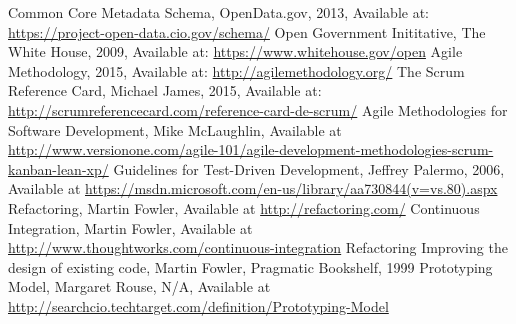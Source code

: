 \begin{thebibliography}{1}
    Common Core Metadata Schema, OpenData.gov, 2013, Available at: \url{https://project-open-data.cio.gov/schema/}
    Open Government Inititative, The White House, 2009, Available at: \url{https://www.whitehouse.gov/open}
    Agile Methodology, 2015, Available at: \url{http://agilemethodology.org/}
    The Scrum Reference Card, Michael James, 2015, Available at: \url{http://scrumreferencecard.com/reference-card-de-scrum/}
    Agile Methodologies for Software Development, Mike McLaughlin, Available at \url{http://www.versionone.com/agile-101/agile-development-methodologies-scrum-kanban-lean-xp/}
    Guidelines for Test-Driven Development, Jeffrey Palermo, 2006, Available at \url{https://msdn.microsoft.com/en-us/library/aa730844(v=vs.80).aspx}
    Refactoring, Martin Fowler, Available at \url{http://refactoring.com/}
    Continuous Integration, Martin Fowler, Available at \url{http://www.thoughtworks.com/continuous-integration}
     Refactoring \: Improving the design of existing code, Martin Fowler, Pragmatic Bookshelf, 1999
     Prototyping Model, Margaret Rouse, N/A, Available at \url{http://searchcio.techtarget.com/definition/Prototyping-Model}
\end{thebibliography}

